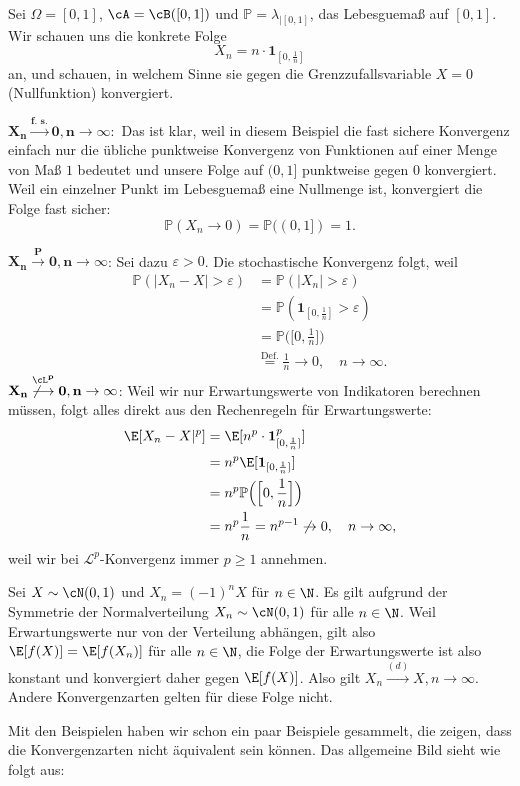 \begin{beispiel}
	Sei $\Omega = [0,1]$, $\cA = \cB([0,1])$ und $\mathbb{P} = \lambda_{|[0,1]}$, das Lebesguema\ss{} auf $[0,1]$. Wir schauen uns die konkrete Folge $$X_n = n \cdot \mathbf{1}_{[0,\frac{1}{n}]}$$ an, und schauen, in welchem Sinne sie gegen die Grenzzufallsvariable $X=0$ (Nullfunktion) konvergiert. \smallskip
			
	$\mathbf{X_n \overset{\text{f. s.}}{\longrightarrow} 0, n \to \infty:}$ Das ist klar, weil in diesem Beispiel die fast sichere Konvergenz einfach nur die \"ubliche punktweise Konvergenz von Funktionen auf einer Menge von Ma\ss{} $1$ bedeutet und unsere Folge auf $(0,1]$ punktweise gegen $0$ konvergiert. Weil ein einzelner Punkt im Lebesguema\ss{} eine Nullmenge ist, konvergiert die Folge fast sicher:	
	$$\mathbb{P}(X_n \to 0) = \mathbb{P}((0,1]) = 1.$$
	
	$\mathbf{X_n \overset{P}{\longrightarrow} 0, n \to \infty}$:	Sei dazu $\varepsilon > 0$. Die stochastische Konvergenz folgt, weil
	\begin{align*}
		\mathbb{P}(|X_n-X| > \varepsilon) &= \mathbb{P}(|X_n| > \varepsilon) \\
		&= \mathbb{P}(\mathbf{1}_{[0,\frac{1}{n}]} > \varepsilon)\\
		& = \mathbb{P}\Big(\Big[0,\frac{1}{n}\Big]\Big)\\
		&\overset{\text{Def.}}{ =} \frac{1}{n} \to 0, \quad n\to\infty.
	\end{align*}	
	$\mathbf{X_n \overset{\cL^p}{\not\longrightarrow} 0, n \to \infty}$: Weil wir nur Erwartungswerte von Indikatoren berechnen m\"ussen, folgt alles direkt aus den Rechenregeln f\"ur Erwartungswerte:
	\begin{align*}
		\E[X_n-X|^p] & = \E[n^p \cdot \mathbf{1}_{[0,\frac{1}{n}]}^p]\\
		& = n^p \E[ \mathbf{1}_{[0,\frac{1}{n}]}] \\
		&= n^p \mathbb{P}\Big(\Big[0,\frac{1}{n}\Big]\Big) \\
		&= n^p  \frac{1}{n} = n^{p-1} \not\to 0,\quad  n \to \infty,
	\end{align*}
	weil wir bei $\mathcal L^p$-Konvergenz immer $p\geq 1$ annehmen.
\end{beispiel}
\begin{beispiel}
	Sei $X \sim \cN(0,1)$ und $X_n = (-1)^n X$ f\"ur $n\in \N$. Es gilt aufgrund der Symmetrie der Normalverteilung $X_n \sim \cN(0,1)$ f\"ur alle $n\in\N$. Weil Erwartungswerte nur von der Verteilung abh\"angen, gilt also $\E[f(X)]=\E[f(X_n)]$ f\"ur alle $n\in\N$, die Folge der Erwartungswerte ist also konstant und konvergiert daher gegen $\E[f(X)]$. Also gilt $X_n \overset{(d)}{\longrightarrow} X, n\to\infty$. Andere Konvergenzarten gelten f\"ur diese Folge nicht.
\end{beispiel}
Mit den Beispielen haben wir schon ein paar Beispiele gesammelt, die zeigen, dass die Konvergenzarten nicht \"aquivalent sein k\"onnen. Das allgemeine Bild sieht wie folgt aus: